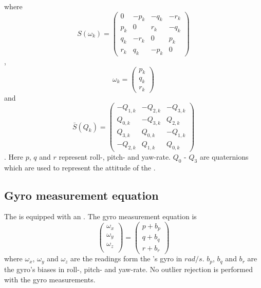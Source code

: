 where
\begin{equation}
S(\omega_{k}) = \begin{pmatrix}
    0 & -p_{k} & -q_{k} & -r_{k} \\
     p_{k} & 0 & r_{k} & -q_{k} \\
     q_{k} & -r_{k} & 0 & p_{k} \\
     r_{k} & q_{k} & -p_{k} &0
\end{pmatrix}
\end{equation},
\begin{equation}
\omega_{k} = \begin{pmatrix}
p_{k}\\
q_{k}\\
r_{k}
\end{pmatrix}
\end{equation}
and
\begin{equation}
\bar{S}(Q_{k}) = \begin{pmatrix}
    -Q_{1,k} & -Q_{2,k} & -Q_{3,k}\\
    Q_{0,k} & -Q_{3,k} &  Q_{2,k}\\
    Q_{3,k} &  Q_{0,k} & -Q_{1,k}\\
    -Q_{2,k} & Q_{1,k} &  Q_{0,k}
\end{pmatrix}
\end{equation}. Here $p$, $q$ and $r$ represent roll-, pitch- and yaw-rate. $Q_0$ - $Q_3$ are quaternions which are used to represent the attitude of the \abbrROV.


\subsection{Gyro measurement equation}
The \abbrROV is equipped with an \abbrIMU. The gyro measurement equation is 
\begin{equation}
\begin{pmatrix}
\omega_x\\
\omega_y\\
\omega_z\\
\end{pmatrix}= \begin{pmatrix}
p + b_p\\
q + b_q\\
r + b_r
\end{pmatrix}
\end{equation}
where $\omega_x$, $\omega_y$ and $\omega_z$ are the readings form the \abbrIMU's gyro in $rad/s$. $b_p$, $b_q$ and $b_r$ are the gyro's biases in roll-, pitch- and yaw-rate. No outlier rejection is performed with the gyro measurements.

